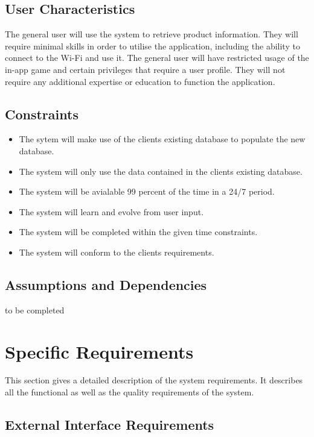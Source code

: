 \documentclass[a4paper,10pt]{article}
\begin{document}
    	\subsection{User Characteristics}  
		{ 
	
{The general user will use the system to retrieve product information. They will require minimal skills in order to utilise the application, including the ability to connect to the Wi-Fi and use it. The general user will have restricted usage of the in-app game and certain privileges that require a user profile. They will not require any additional expertise or education to function the application.\\}
    	\subsection{Constraints}
	\begin{itemize}
		\item The sytem will make use of the clients existing database to populate the new database.
		\item The system will only use the data contained in the clients existing database.
		\item The system will be avialable 99 percent of the time in a 24/7 period.
		\item The system will learn and evolve from user input.
		\item The system will be completed within the given time constraints.
		\item The system will conform to the clients requirements.
		
	\end{itemize}
	
    	\subsection{Assumptions and Dependencies}
to be completed

	\newpage
		
	\section{Specific Requirements}
This section gives a detailed description of the system requirements. It describes all the functional as well as the quality requirements of the system.

	\subsection{External Interface Requirements}

}
\end{document}

